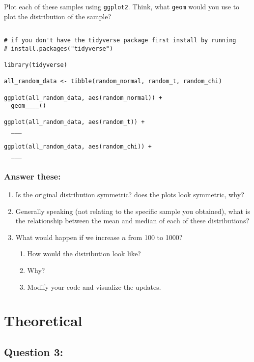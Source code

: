 \documentclass[
]{article}
\providecommand{\tightlist}{%
  \setlength{\itemsep}{0pt}\setlength{\parskip}{0pt}}
\begin{document}
Plot each of these samples using \texttt{ggplot2}. Think, what
\texttt{geom} would you use to plot the distribution of the sample?

\begin{verbatim}

# if you don't have the tidyverse package first install by running
# install.packages("tidyverse")

library(tidyverse) 

all_random_data <- tibble(random_normal, random_t, random_chi)

ggplot(all_random_data, aes(random_normal)) + 
  geom____()

ggplot(all_random_data, aes(random_t)) + 
  ___

ggplot(all_random_data, aes(random_chi)) + 
  ___
\end{verbatim}

\hypertarget{answer-these}{%
\subsubsection{Answer these:}\label{answer-these}}

\begin{enumerate}
\def\labelenumi{\arabic{enumi}.}
\item
  Is the original distribution symmetric? does the plots look symmetric,
  why?
\item
  Generally speaking (not relating to the specific sample you obtained),
  what is the relationship between the mean and median of each of these
  distributions?
\item
  What would happen if we increase \(n\) from 100 to 1000?

  \begin{enumerate}
  \def\labelenumii{\alph{enumii}.}
  \tightlist
  \item
    How would the distribution look like?
  \item
    Why?
  \item
    Modify your code and visualize the updates.
  \end{enumerate}
\end{enumerate}

\hypertarget{theoretical}{%
\section{Theoretical}\label{theoretical}}

\hypertarget{question-3}{%
\subsection{Question 3:}\label{question-3}}
\end{document}
